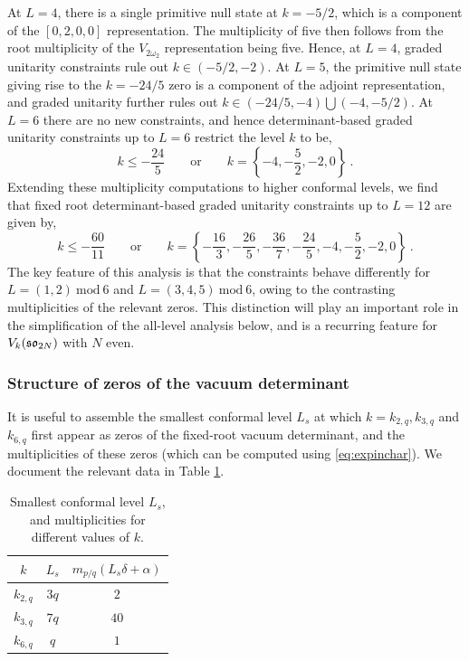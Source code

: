 At $L = 4$, there is a single primitive null state at $k = -5/2$, which is a component of the $[0,2,0,0]$ representation. The multiplicity of five then follows from the root multiplicity of the $V_{2\omega_2}$ representation being five. Hence, at $L = 4$, graded unitarity constraints rule out $k \in (-5/2,-2)$. At $L = 5$, the primitive null state giving rise to the $k = -24/5$ zero is a component of the adjoint representation, and graded unitarity further rules out $k \in (-24/5,-4) \bigcup (-4, -5/2)$. At $L = 6$ there are no new constraints, and hence determinant-based graded unitarity constraints up to $L = 6$ restrict the level $k$ to be,
\begin{equation}
    k \leqslant -\frac{24}{5} \qquad \text{or} \qquad k = \left\{-4, -\frac{5}{2},-2,0 \right\}~.
\end{equation}
Extending these multiplicity computations to higher conformal levels, we find that fixed root determinant-based graded unitarity constraints up to $L = 12$ are given by,
\begin{equation} \label{eq:lowlevelso8fullconst}
    k \leqslant -\frac{60}{11} \qquad \text{or} \qquad k = \left\{-\frac{16}{3}, -\frac{26}{5}, -\frac{36}{7}, -\frac{24}{5}, -4, -\frac{5}{2}, -2, 0  \right\}~.
\end{equation}
The key feature of this analysis is that the constraints behave differently for $L=(1,2)~\mathrm{mod}~6$ and $L=(3,4,5)~\mathrm{mod}~6$, owing to the contrasting multiplicities of the relevant zeros. This distinction will play an important role in the simplification of the all-level analysis below, and is a recurring feature for $V_k(\mathfrak{so}_{2N})$ with $N$ even.

\subsubsection{Structure of zeros of the vacuum determinant}
It is useful to assemble the smallest conformal level $L_s$ at which $k = k_{2,q}, k_{3,q}$ and $k_{6,q}$ first appear as zeros of the fixed-root vacuum determinant, and the multiplicities of these zeros (which can be computed using \eqref{eq:expinchar}). We document the relevant data in Table \ref{tb:multandLevforso8}.

\begin{table}[]
\centering
\begin{tabular}{|c|c|c|}
\hline\hline
$k$ & $L_s$ & $m_{p/q}(L_s\delta+\alpha)$ \\
\hline\hline
$k_{2,q}$ & $3q$ & $2$ \\
$k_{3,q}$ & $7q$ & $40$ \\
$k_{6,q}$ & $q$ & $1$ \\
\hline
\end{tabular}
\caption{Smallest conformal level $L_s$, and multiplicities for different values of $k$.}
\label{tb:multandLevforso8}
\end{table}

